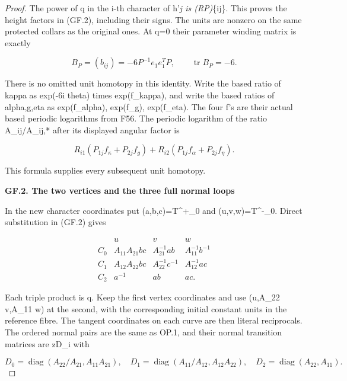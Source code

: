 \begin{proof}
The power of q in the i-th character of h'\emph{j is (RP)}\{ij\}.
This proves the height factors in (GF.2), including their signs.
The units are nonzero on the same protected collars as the original
ones. At q=0 their parameter winding matrix is exactly

\[
 B_P=(b_{ij})=-6P^{-1}e_1e_1^TP,
                    \qquad\operatorname{tr}B_P=-6.   \tag{GF.4}
\]

There is no omitted unit homotopy in this identity. Write the based
ratio of kappa as exp(-6i theta) times exp(f\_kappa), and write the
based ratios of alpha,g,eta as exp(f\_alpha), exp(f\_g), exp(f\_eta).
The four f's are their actual based periodic logarithms from F56.
The periodic logarithm of the ratio A\_ij/A\_ij,* after its displayed
angular factor is

\[
 R_{i1}(P_{1j}f_\kappa+P_{2j}f_g)
       +R_{i2}(P_{1j}f_\alpha+P_{2j}f_\eta).          \tag{GF.5}
\]

This formula supplies every subsequent unit homotopy.

\par

\medskip\noindent\textbf{GF.2. The two vertices and the three full normal loops}

\par\nobreak

In the new character coordinates put (a,b,c)=T\^{}+\_0 and
(u,v,w)=T\^{}-\_0. Direct substitution in (GF.2) gives

\[
\begin{array}{c|ccc}
 &u&v&w\\ \hline
 C_0&A_{11}A_{21}bc&A_{21}^{-1}ab&A_{11}^{-1}b^{-1}\\
 C_1&A_{12}A_{22}bc&A_{22}^{-1}c^{-1}&A_{12}^{-1}ac\\
 C_2&a^{-1}&ab&ac.
\end{array}                                                   \tag{GF.6}
\]

Each triple product is q. Keep the first vertex coordinates and
use (u,A\_22 v,A\_11 w) at the second, with the corresponding
initial constant units in the reference fibre. The tangent
coordinates on each curve are then literal reciprocals. The
ordered normal pairs are the same as OP.1, and their normal
transition matrices are zD\_i with

\[
 D_0=\operatorname{diag}(A_{22}/A_{21},A_{11}A_{21}),\quad
 D_1=\operatorname{diag}(A_{11}/A_{12},A_{12}A_{22}),\quad
 D_2=\operatorname{diag}(A_{22},A_{11}).                \tag{GF.7}
\]


\end{proof}
